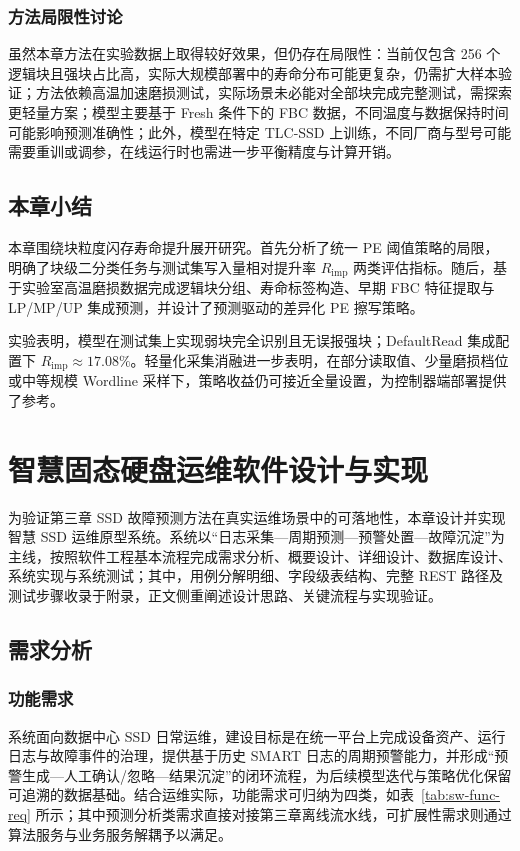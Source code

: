 \subsection{方法局限性讨论}

虽然本章方法在实验数据上取得较好效果，但仍存在局限性：当前仅包含 256 个逻辑块且强块占比高，实际大规模部署中的寿命分布可能更复杂，仍需扩大样本验证；方法依赖高温加速磨损测试，实际场景未必能对全部块完成完整测试，需探索更轻量方案；模型主要基于 Fresh 条件下的 FBC 数据，不同温度与数据保持时间可能影响预测准确性；此外，模型在特定 TLC-SSD 上训练，不同厂商与型号可能需要重训或调参，在线运行时也需进一步平衡精度与计算开销。

\section{本章小结}

本章围绕块粒度闪存寿命提升展开研究。首先分析了统一 PE 阈值策略的局限，明确了块级二分类任务与测试集写入量相对提升率 $R_{\mathrm{imp}}$ 两类评估指标。随后，基于实验室高温磨损数据完成逻辑块分组、寿命标签构造、早期 FBC 特征提取与 LP/MP/UP 集成预测，并设计了预测驱动的差异化 PE 擦写策略。

实验表明，模型在测试集上实现弱块完全识别且无误报强块；DefaultRead 集成配置下 $R_{\mathrm{imp}} \approx 17.08\%$。轻量化采集消融进一步表明，在部分读取值、少量磨损档位或中等规模 Wordline 采样下，策略收益仍可接近全量设置，为控制器端部署提供了参考。


\chapter{智慧固态硬盘运维软件设计与实现}

为验证第三章 SSD 故障预测方法在真实运维场景中的可落地性，本章设计并实现智慧 SSD 运维原型系统。系统以“日志采集—周期预测—预警处置—故障沉淀”为主线，按照软件工程基本流程完成需求分析、概要设计、详细设计、数据库设计、系统实现与系统测试；其中，用例分解明细、字段级表结构、完整 REST 路径及测试步骤收录于附录，正文侧重阐述设计思路、关键流程与实现验证。

\section{需求分析}

\subsection{功能需求}

系统面向数据中心 SSD 日常运维，建设目标是在统一平台上完成设备资产、运行日志与故障事件的治理，提供基于历史 SMART 日志的周期预警能力，并形成“预警生成—人工确认/忽略—结果沉淀”的闭环流程，为后续模型迭代与策略优化保留可追溯的数据基础。结合运维实际，功能需求可归纳为四类，如表~\ref{tab:sw-func-req} 所示；其中预测分析类需求直接对接第三章离线流水线，可扩展性需求则通过算法服务与业务服务解耦予以满足。

